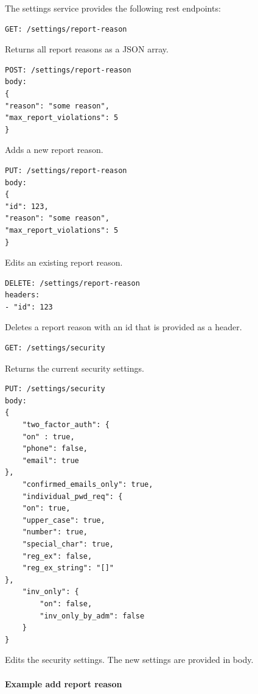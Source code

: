 The settings service provides the following \ac{rest} endpoints:

\begin{lstlisting}[label={lst:lstlisting}]
GET: /settings/report-reason
\end{lstlisting}

Returns all report reasons as a JSON array.

\begin{lstlisting}[label={lst:lstlisting2}]
POST: /settings/report-reason
body:
{
"reason": "some reason",
"max_report_violations": 5
}
\end{lstlisting}

Adds a new report reason.

\begin{lstlisting}[label={lst:lstlisting3}]
PUT: /settings/report-reason
body:
{
"id": 123,
"reason": "some reason",
"max_report_violations": 5
}
\end{lstlisting}

Edits an existing report reason.

\begin{lstlisting}[label={lst:lstlisting4}]
DELETE: /settings/report-reason
headers:
- "id": 123
\end{lstlisting}

Deletes a report reason with an id that is provided as a header.

\begin{lstlisting}[label={lst:lstlisting5}]
GET: /settings/security
\end{lstlisting}

Returns the current security settings.

\begin{lstlisting}[label={lst:lstlisting6}]
PUT: /settings/security
body:
{
    "two_factor_auth": {
    "on" : true,
    "phone": false,
    "email": true
},
    "confirmed_emails_only": true,
    "individual_pwd_req": {
    "on": true,
    "upper_case": true,
    "number": true,
    "special_char": true,
    "reg_ex": false,
    "reg_ex_string": "[]"
},
    "inv_only": {
        "on": false,
        "inv_only_by_adm": false
    }
}
\end{lstlisting}

Edits the security settings.
The new settings are provided in body.

\paragraph{Example add report reason}

